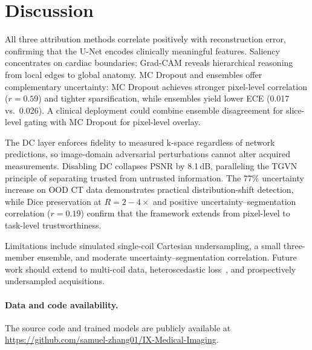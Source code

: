 \documentclass[runningheads]{llncs}
\begin{document}
\section{Discussion}\label{sec:discussion}

All three attribution methods correlate positively with reconstruction error, confirming that the U-Net encodes clinically meaningful features. Saliency concentrates on cardiac boundaries; Grad-CAM reveals hierarchical reasoning from local edges to global anatomy. MC Dropout and ensembles offer complementary uncertainty: MC Dropout achieves stronger pixel-level correlation ($r{=}0.59$) and tighter sparsification, while ensembles yield lower ECE (0.017 vs.\ 0.026). A clinical deployment could combine ensemble disagreement for slice-level gating with MC Dropout for pixel-level overlay.

The DC layer enforces fidelity to measured k-space regardless of network predictions, so image-domain adversarial perturbations cannot alter acquired measurements. Disabling DC collapses PSNR by 8.1\,dB, paralleling the TGVN~\cite{atalik2026tgvn} principle of separating trusted from untrusted information. The 77\% uncertainty increase on OOD CT data demonstrates practical distribution-shift detection, while Dice preservation at $R{=}2{-}4{\times}$ and positive uncertainty--segmentation correlation ($r{=}0.19$) confirm that the framework extends from pixel-level to task-level trustworthiness.

Limitations include simulated single-coil Cartesian undersampling, a small three-member ensemble, and moderate uncertainty--segmentation correlation. Future work should extend to multi-coil data, heteroscedastic loss~\cite{edupuganti2021uncertainty}, and prospectively undersampled acquisitions.

\paragraph{Data and code availability.} The source code and trained models are publicly available at \url{https://github.com/samuel-zhang01/IX-Medical-Imaging}.
\end{document}
